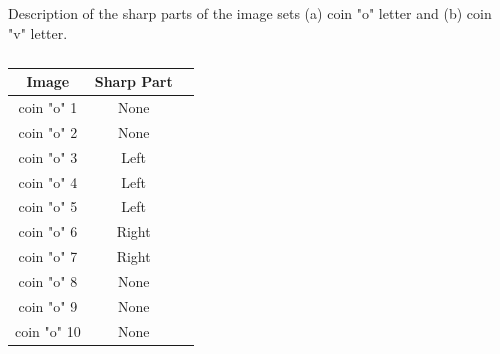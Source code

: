 \begin{table}[H]
    \centering
    \caption{Description of the sharp parts of the image sets (a) coin "o" letter and (b) coin "v" letter.}\label{tab:coin_card_set_description}
    \begin{subtable}{.35\linewidth}
    
		\begin{center}
		\caption{}
        \begin{tabular}
        {|c|c|c|}
        \hline
        
            Image & Sharp Part
            \\ \hline
            coin "o" 1 & None
            \\ \hline
            
            coin "o" 2 & None
            \\ \hline
            
            coin "o" 3 & Left
            \\ \hline
            
            coin "o" 4& Left
            \\ \hline
            
            coin "o" 5 & Left
            \\ \hline
            
            coin "o" 6 & Right
            \\ \hline
            
            coin "o" 7 & Right
            \\ \hline
            
            coin "o" 8 & None
            \\ \hline
            
            coin "o" 9 & None
            \\ \hline
            
            coin "o" 10 & None
            \\ \hline
            
        \end{tabular}
    \end{center}
    \end{subtable}%
    \begin{subtable}{.35\linewidth}

		\begin{center}
		\caption{}
        \begin{tabular}
        {|c|c|c|}
        \hline
        

\end{tabular}
\end{center}
\end{subtable}
\end{table}
